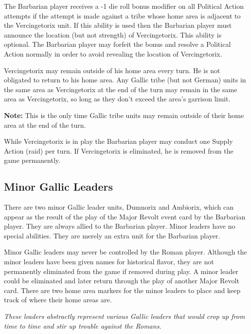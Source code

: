 The Barbarian player receives a -1 die roll bonus modifier on all Political Action attempts if the attempt is made against a tribe whose home area is adjacent to the Vercingetorix unit. If this ability is used then the Barbarian player must announce the location (but not strength) of Vercingetorix. This ability is optional. The Barbarian player may forfeit the bonus and resolve a Political Action normally in order to avoid revealing the location of Vercingetorix.

Vercingetorix may remain outside of his home area every turn. He is not obligated to return to his home area. Any Gallic tribe (but not German) units in the same area as Vercingetorix at the end of the turn may remain in the same area as Vercingetorix, so long as they don’t exceed the area’s garrison limit.

\textbf{Note:} This is the only time Gallic tribe units may remain outside of their home area at the end of the turn.

While Vercingetorix is in play the Barbarian player may conduct one Supply Action (raid) per turn. If Vercingetorix is eliminated, he is removed from the game permanently.

\subsection{Minor Gallic Leaders}
\par
There are two minor Gallic leader units, Dumnorix and Ambiorix, which can appear as the result of the play of the Major Revolt event card by the Barbarian player. They are always allied to the Barbarian player. Minor leaders have no special abilities. They are merely an extra unit for the Barbarian player.

Minor Gallic leaders may never be controlled by the Roman player. Although the minor leaders have been given names for historical flavor, they are not permanently eliminated from the game if removed during play. A minor leader could be eliminated and later return through the play of another Major Revolt card. There are two home area markers for the minor leaders to place and keep track of where their home areas are.

\textit{These leaders abstractly represent various Gallic leaders that would crop up from time to time and stir up trouble against the Romans.}

